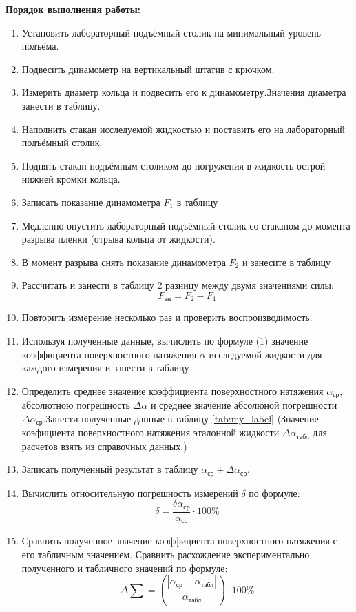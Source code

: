 \textbf{Порядок выполнения работы:}
\begin{enumerate}
    \item {Установить лабораторный подъёмный столик на минимальный уровень подъёма.}
    \item {Подвесить динамометр на вертикальный штатив с крючком.}
    \item {Измерить диаметр кольца и подвесить его к динамометру.Значения диаметра занести в таблицу.}
    \item {Наполнить стакан исследуемой жидкостью и поставить его на лабораторный подъёмный столик.}
    \item {Поднять стакан подъёмным столиком до погружения в жидкость острой нижней кромки кольца.}
    \item {Записать показание динамометра \texttt{$F_1$} в таблицу}
    \item {Медленно опустить лабораторный подъёмный столик со стаканом до момента разрыва пленки (отрыва кольца от жидкости).}
    \item {В момент разрыва снять показание динамометра \texttt{$F_2$} и занесите в таблицу}
    \item {
        Рассчитать и занести в таблицу 2 разницу между двумя значениями силы:
        \begin{equation*}
            F_\text{вн} = F_2 - F_1
        \end{equation*}
    }
    \item {Повторить измерение несколько раз и проверить воспроизводимость.}
    \item {Используя полученные данные, вычислить по формуле (1) значение коэффициента поверхностного натяжения \texttt{$\alpha$} исследуемой жидкости для каждого измерения и занести в таблицу}
    \item {Определить среднее значение коэффициента поверхностного натяжения \texttt{$\alpha _\text{ср}$}, абсолютною погрешность \texttt{$\Delta \alpha$} и среднее значение абсолюной погрешности \texttt{$\Delta \alpha _\text{ср}$}.Занести полученные данные в таблицу \ref{tab:my_label} (Значение коэфициента поверхностного натяжения эталонной жидкости \texttt{$\Delta \alpha _\text{табл}$} для расчетов взять из справочных данных.)}
    \item {Записать полученный результат в таблицу \texttt{$\alpha _\text{ср} \pm \Delta \alpha _\text{ср}$}.}
    \item {
        Вычислить относительную погрешность измерений \texttt{$\delta$} по формуле:
        \begin{equation*}
            \delta = \frac{\delta \alpha _ \text{ср}}{\alpha _ \text{ср}} \cdot 100\% 
        \end{equation*}
    }
    \item {
        Сравнить полученное значение коэффициента поверхностного натяжения с его табличным значением. Сравнить расхождение экспериментально полученного и табличного значений по формуле:
        \begin{equation*}
            \Delta \sum =  \left(\frac{| \alpha _\text{ср} - \alpha _\text{табл}|}{\alpha _\text{табл}} \right) \cdot 100\%
        \end{equation*}
    }
\end{enumerate}
    
